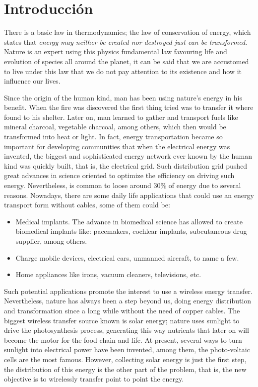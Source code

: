 \documentclass{intech}
\affiliation{Universidad Veracruzana \\ Facultad de Instrumentaci\'on Electr\'onica}
\begin{document}
\maketitle

\section{Introducci\'on}

There is a basic law in thermodynamics; the law of conservation of energy, which states that {\it energy may neither be created nor destroyed just can be transformed}. Nature is an expert using this physics fundamental law favouring life and evolution of species all around the planet, it can be said that we are accustomed to live under this law that we do not pay attention to its existence and how it influence our lives.

Since the origin of the human kind, man has been using nature's energy in his benefit. When the fire was discovered the first thing tried was to transfer it where found to his shelter. Later on, man learned to gather and transport fuels like mineral charcoal, vegetable charcoal, among others, which then would be transformed into heat or light. In fact, energy transportation became so important for developing communities that when the electrical energy was invented, the biggest and sophisticated energy network ever known by the human kind was quickly built, that is, the electrical grid. Such distribution grid pushed great advances in science oriented to optimize the efficiency on driving such energy. Nevertheless, is common to loose around 30\% of energy due to several reasons. Nowadays, there are some daily life applications that could use an energy transport form without cables, some of them could be:

\begin{itemize}
\item Medical implants. The advance in biomedical science has allowed to create biomedical implants like: pacemakers, cochlear implants, subcutaneous drug supplier, among others.
\item Charge mobile devices, electrical cars, unmanned aircraft, to name a few.
\item Home appliances like irons, vacuum cleaners, televisions, etc.
\end{itemize}

Such potential applications promote the interest to use a wireless energy transfer.  Nevertheless, nature has always been a step beyond us, doing energy distribution and transformation since a long while without the need of copper cables. The biggest wireless transfer source known is solar energy; nature uses sunlight to drive the photosynthesis process, generating this way nutrients that later on will become the motor for the food chain and life. At present, several ways to turn sunlight into electrical power have been invented, among them, the photo-voltaic cells are the most famous. However, collecting solar energy is just the first step, the distribution of this energy is the other part of the problem, that is, the new objective is to wirelessly transfer point to point the energy.
\end{document}
